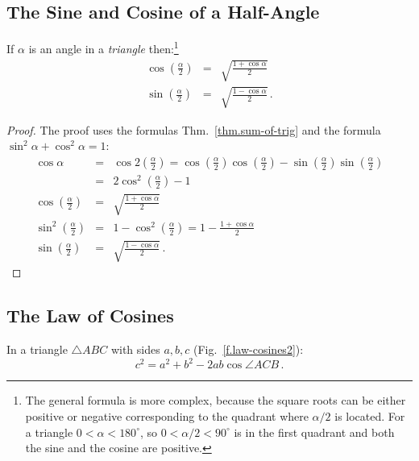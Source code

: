 \subsection{The Sine and Cosine of a Half-Angle}\label{s.sine-cosine-half}
\begin{theorem}\label{thm.sine-cosine-half}
If $\alpha$ is an angle in a \emph{triangle} then:\footnote{The general formula is more complex,  because the square roots can be either positive or negative corresponding to the quadrant where $\alpha/2$ is located. For a triangle $0\!<\!\alpha\!<\!180^\circ$, so $0\!<\!\alpha/2\!<\!90^\circ$ is in the first quadrant and both the sine and the cosine are positive.}
%
\begin{eqnarray*}
\cos \left(\frac{\alpha}{2}\right)&=&\sqrt{\frac{1+\cos\alpha}{2}}\\
\sin\left(\frac{\alpha}{2}\right)&=&\sqrt{\frac{1-\cos\alpha}{2}}\,.
\end{eqnarray*}
\end{theorem}

\begin{proof}
The proof uses the formulas Thm.~\ref{thm.sum-of-trig} and the formula $\sin^2\alpha+\cos^2\alpha=1$:
%
\begin{eqnarray*}
\cos \alpha&=&\cos 2\left(\frac{\alpha}{2}\right)=\cos \left(\frac{\alpha}{2}\right)\cos\left(\frac{\alpha}{2}\right)-\sin \left(\frac{\alpha}{2}\right)\sin\left(\frac{\alpha}{2}\right)\\
&=&2\cos^2 \left(\frac{\alpha}{2}\right)-1\\
\cos \left(\frac{\alpha}{2}\right)&=&\sqrt{\frac{1+\cos\alpha}{2}}\\
\sin^2\left(\frac{\alpha}{2}\right)&=& 1-\cos^2\left(\frac{\alpha}{2}\right)=1-\frac{1+\cos\alpha}{2}\\
\sin \left(\frac{\alpha}{2}\right)&=&\sqrt{\frac{1-\cos\alpha}{2}}\,.
\end{eqnarray*}
\end{proof}


\subsection{The Law of Cosines}

\begin{theorem}
In  a triangle $\triangle ABC$ with sides $a,b,c$ (Fig.~\ref{f.law-cosines2}):\label{thm.law-of-cosines}
\[
c^2=a^2+b^2-2ab\cos \angle ACB\,.
\]
\end{theorem}

